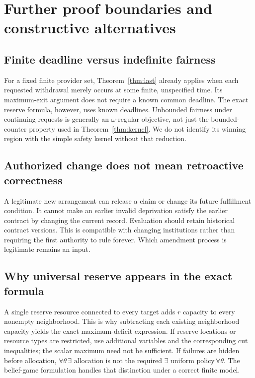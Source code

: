\section{Further proof boundaries and constructive alternatives}
\subsection{Finite deadline versus indefinite fairness}
For a fixed finite provider set, Theorem~\ref{thm:last} already applies when each requested withdrawal merely occurs at some finite, unspecified time. Its maximum-exit argument does not require a known common deadline. The exact reserve formula, however, uses known deadlines. Unbounded fairness under continuing requests is generally an $\omega$-regular objective, not just the bounded-counter property used in Theorem~\ref{thm:kernel}. We do not identify its winning region with the simple safety kernel without that reduction.

\subsection{Authorized change does not mean retroactive correctness}
A legitimate new arrangement can release a claim or change its future fulfillment condition. It cannot make an earlier invalid deprivation satisfy the earlier contract by changing the current record. Evaluation should retain historical contract versions. This is compatible with changing institutions rather than requiring the first authority to rule forever. Which amendment process is legitimate remains an input.

\subsection{Why universal reserve appears in the exact formula}
A single reserve resource connected to every target adds $r$ capacity to every nonempty neighborhood. This is why subtracting each existing neighborhood capacity yields the exact maximum-deficit expression. If reserve locations or resource types are restricted, use additional variables and the corresponding cut inequalities; the scalar maximum need not be sufficient. If failures are hidden before allocation, $\forall\theta\,\exists\text{ allocation}$ is not the required $\exists\text{ uniform policy}\,\forall\theta$. The belief-game formulation handles that distinction under a correct finite model.

